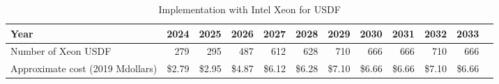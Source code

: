 \tiny \begin{longtable} { |p{}  |r  |r  |r  |r  |r  |r  |r  |r  |r  |r  |r |} 
\caption{Implementation with Intel Xeon for USDF \label{tab:opsXeonUSDF}}\\ 
\hline 
\textbf{Year}&\textbf{2024}&\textbf{2025}&\textbf{2026}&\textbf{2027}&\textbf{2028}&\textbf{2029}&\textbf{2030}&\textbf{2031}&\textbf{2032}&\textbf{2033} \\ \hline
{Number of Xeon USDF}&{279}&{295}&{487}&{612}&{628}&{710}&{666}&{666}&{710}&{666} \\ \hline
{Approximate cost (2019 Mdollars)}&{\$2.79}&{\$2.95}&{\$4.87}&{\$6.12}&{\$6.28}&{\$7.10}&{\$6.66}&{\$6.66}&{\$7.10}&{\$6.66} \\ \hline
\end{longtable} \normalsize
